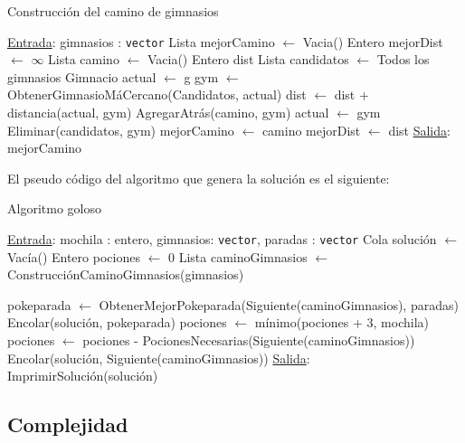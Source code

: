 \begin{algorithm}[H]
\label{}
\caption{Construcci\'on del camino de gimnasios}
\begin{algorithmic}[1]
\Statex \underline{Entrada}: gimnasios : \texttt{vector}
\medskip
\State Lista mejorCamino $\leftarrow$ Vacia()
\State Entero mejorDist $\leftarrow$ $\infty$
	\State Lista camino $\leftarrow$ Vacia()
	\State Entero dist
	\State Lista candidatos $\leftarrow$ Todos los gimnasios
	\State Gimnacio actual $\leftarrow$ g
		\State gym $\leftarrow$ ObtenerGimnasioM\'aCercano(Candidatos, actual)
		\State dist $\leftarrow$ dist + distancia(actual, gym)
		\State AgregarAtr\'as(camino, gym)
		\State actual $\leftarrow$ gym
		\State Eliminar(candidatos, gym)
	\EndWhile
		\State mejorCamino $\leftarrow$ camino
		\State mejorDist $\leftarrow$ dist
	\EndIf
\EndFor
\medskip
\Statex \underline{Salida}: mejorCamino
\end{algorithmic}
\end{algorithm}

El pseudo código del algoritmo que genera la solución es el siguiente:

\begin{algorithm}[H]
\label{}
\caption{Algoritmo goloso}
\begin{algorithmic}[1]
\Statex \underline{Entrada}: mochila : entero, gimnasios: \texttt{vector}, paradas : \texttt{vector}
\State Cola soluci\'on $\leftarrow$ Vac\'ia()
\State Entero pociones $\leftarrow$ 0
\State Lista caminoGimnasios $\leftarrow$ Construcci\'onCaminoGimnasios(gimnasios)

		\State pokeparada $\leftarrow$ ObtenerMejorPokeparada(Siguiente(caminoGimnasios), paradas)
		\State Encolar(soluci\'on, pokeparada)
		\State pociones $\leftarrow$ m\'inimo(pociones + 3, mochila)
	\EndWhile
	\State pociones $\leftarrow$ pociones - PocionesNecesarias(Siguiente(caminoGimnasios))
	Encolar(soluci\'on, Siguiente(caminoGimnasios))
\EndWhile
\medskip
\Statex \underline{Salida}: ImprimirSoluci\'on(soluci\'on)
\end{algorithmic}
\end{algorithm}

\subsection{Complejidad}

